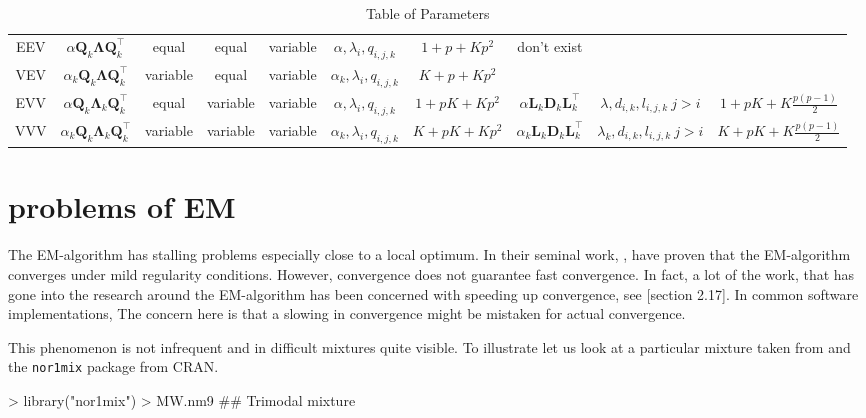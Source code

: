 \begin{table}[!htb]
{\begin{tabular}{| c | c c c c c c | c c c |}
        EEV    & $ \alpha \pmb{Q}_k \pmb{\Lambda} \pmb{Q}_k^\top $ &equal & equal & variable & $ \alpha, \lambda_{i}, q_{i,j,k} $ & $ 1+p+Kp^2 $ &  don't exist  & & \\
        VEV    & $ \alpha_k \pmb{Q}_k \pmb{\Lambda} \pmb{Q}_k^\top $ &variable & equal & variable & $ \alpha_k, \lambda_{i}, q_{i,j,k} $ & $ K+p+Kp^2 $ & & & \\
        \hline
        EVV    & $ \alpha \pmb{Q}_k \pmb{\Lambda}_k \pmb{Q}_k^\top $ & equal & variable & variable & $ \alpha, \lambda_{i}, q_{i,j,k} $ & $ 1+pK+Kp^2 $ & $ \alpha \pmb{L}_k \pmb{D}_k \pmb{L}_k^\top $ & $ \lambda, d_{i,k}, l_{i,j,k}\ j>i $ & $ 1+pK+K\frac{p(p-1)}{2} $ \\
        VVV    & $ \alpha_k \pmb{Q}_k \pmb{\Lambda}_k \pmb{Q}_k^\top $ & variable & variable & variable & $ \alpha_k, \lambda_{i}, q_{i,j,k} $ & $ K+pK+Kp^2 $ & $ \alpha_k \pmb{L}_k \pmb{D}_k \pmb{L}_k^\top $ & $ \lambda_k, d_{i,k}, l_{i,j,k}\ j>i $ & $ K+pK+K\frac{p(p-1)}{2} $ \\
        \hline
    \end{tabular}

}

\caption{Table of Parameters}
\label{table:param}
\end{table}

\clearpage


\section{problems of EM}


The EM-algorithm has stalling problems especially close to a local optimum.
In their seminal work, \cite{Dem77}, have proven that the EM-algorithm 
converges under mild regularity conditions. 
However, convergence does not guarantee fast convergence. In fact, a lot of 
the work, that has gone into the research around the EM-algorithm has been 
concerned with speeding up convergence, see \cite{McL00}[section 2.17].
In common software implementations, %
The concern here is that a slowing in convergence might be mistaken for actual
convergence.

This phenomenon is not infrequent and in difficult mixtures quite visible.
To illustrate let us look at a particular mixture taken from \cite{Mar92} and
the {\tt nor1mix} package from CRAN.

\begin{Schunk}
\begin{Sinput}
> library("nor1mix")
> MW.nm9 ## Trimodal mixture
\end{Sinput}
\end{Schunk}


